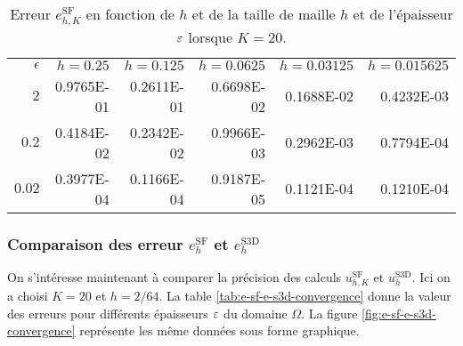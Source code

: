 \begin{table}[t]
  \caption{Erreur $e_{h,K}^\mathrm{SF}$ en fonction de $h$ et de
    la taille de maille $h$ et de l'épaisseur $\varepsilon$ lorsque $K
    = 20$.}
  \label{tab:n-h-convergence}
  \begin{center}
    \begin{tabular}{@{}rrrrrr@{}}
      \toprule
      $\epsilon$ & $h = 0.25$ & $h = 0.125$ & $h = 0.0625$ & $h = 0.03125$ & $h = 0.015625$ \\
      \cmidrule{1-6}
      $2$      & \num{0.9765E-01} & \num{0.2611E-01} & \num{0.6698E-02} & \num{0.1688E-02} & \num{0.4232E-03} \\
      $0.2$    & \num{0.4184E-02} & \num{0.2342E-02} & \num{0.9966E-03} & \num{0.2962E-03} & \num{0.7794E-04} \\
      $0.02$   & \num{0.3977E-04} & \num{0.1166E-04} & \num{0.9187E-05} & \num{0.1121E-04} & \num{0.1210E-04} \\
      \bottomrule
    \end{tabular}
  \end{center}
\end{table}


\subsubsection{Comparaison des erreur $e_h^{\mathrm{SF}}$ et
  $e_h^{\mathrm{S3D}}$} On s'intéresse maintenant à comparer la
précision des calculs $u_{h,K}^\mathrm{SF}$ et
$u_h^{\mathrm{S3D}}$. Ici on a choisi $K = 20$ et $h = 2/64$. La table
\ref{tab:e-sf-e-s3d-convergence} donne la valeur des erreurs pour
différents épaisseurs $\varepsilon$ du domaine $\Omega$. La figure
\ref{fig:e-sf-e-s3d-convergence} représente les même données sous
forme graphique.

